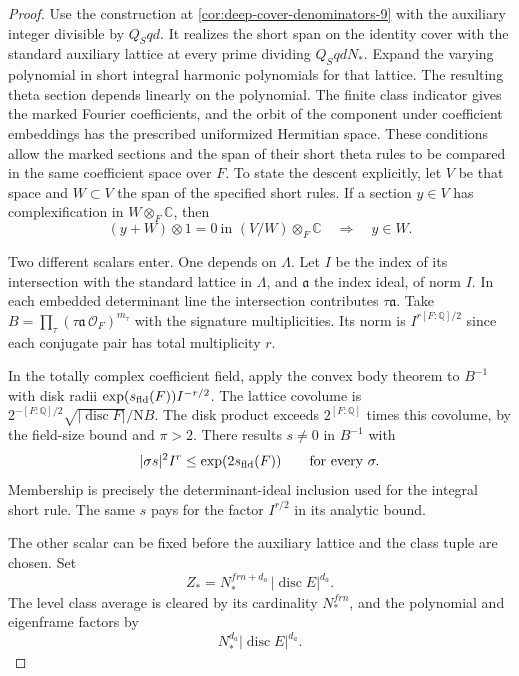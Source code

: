 \begin{proof}
Use the construction at \ref{cor:deep-cover-denominators-9} with
the auxiliary integer divisible by \(Q_S qd\). It realizes the
short span on the identity cover with the standard auxiliary
lattice at every prime dividing \(Q_S qd N_*\). Expand the varying polynomial in short integral harmonic polynomials for that lattice. The resulting theta section depends linearly on the polynomial. The finite class indicator gives the
marked Fourier coefficients, and the orbit of the component
under coefficient embeddings has the prescribed uniformized
Hermitian space. These conditions allow the marked sections and the span of their short theta rules to be compared in the same coefficient space over \(F\).
To state the descent explicitly, let \(V\) be that space and
\(W\subset V\) the span of the specified short rules. If a section \(y\in V\) has complexification in \(W\otimes_F\mathbb C\),
then
\[
 (y+W)\otimes1=0\ \text{in }(V/W)\otimes_F\mathbb C
                 \quad\Longrightarrow\quad y\in W .
\]

Two different scalars enter. One depends on \(\Lambda\).
Let \(I\) be the index of its intersection with the
standard lattice in \(\Lambda\), and \(\mathfrak a\) the
index ideal, of norm \(I\). In each embedded determinant
line the intersection contributes \(\tau\mathfrak a\).
Take \(B=\prod_\tau(\tau\mathfrak a\,\mathcal O_F)^{m_\tau}\)
with the signature multiplicities. Its norm is
\(I^{r[F:\mathbb Q]/2}\) since each conjugate pair
has total multiplicity \(r\).

In the totally complex
coefficient field, apply the convex body theorem to
\(B^{-1}\) with disk radii
\(\exp(s_{\rm fld}(F)) I^{-r/2}\). The lattice
covolume is \(2^{-[F:\mathbb Q]/2}
\sqrt{|\operatorname{disc} F|}/\mathrm N B\).
The disk product exceeds \(2^{[F:\mathbb Q]}\) times this
covolume, by the field-size bound and \(\pi>2\).
There results \(s\ne0\) in \(B^{-1}\) with
\[
   |\sigma s|^2 I^r\le \exp(2s_{\rm fld}(F))
           \qquad\text{for every }\sigma.
\]
Membership is precisely the determinant-ideal inclusion
used for the integral short rule. The same \(s\) pays
for the factor \(I^{r/2}\) in its analytic bound.

The other scalar can be fixed before the auxiliary lattice
and the class tuple are chosen. Set
\[
    Z_* = N_*^{frn+d_a}\,|\operatorname{disc}E|^{d_a}.
\]
The level class average is cleared by its cardinality
\(N_*^{frn}\), and the polynomial and eigenframe factors
by
\[
 N_*^{d_a}|\operatorname{disc}E|^{d_a}.
\]


\end{proof}
